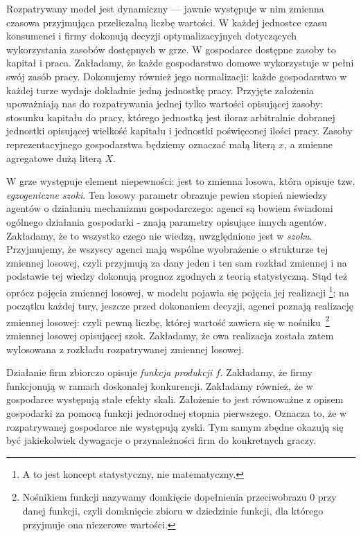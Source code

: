 Rozpatrywany model jest dynamiczny --- jawnie występuje w nim zmienna czasowa przyjmująca przeliczalną liczbę wartości. W każdej jednostce czasu konsumenci i firmy dokonują decyzji optymalizacyjnych dotyczących wykorzystania zasobów dostępnych w grze. W gospodarce dostępne zasoby to kapitał i praca. Zakładamy, że każde gospodarstwo domowe wykorzystuje w pełni swój zasób pracy. Dokonujemy również jego normalizacji: każde gospodarstwo w każdej turze wydaje dokładnie jedną jednostkę pracy. Przyjęte założenia upoważniają nas do rozpatrywania jednej tylko wartości opisującej zasoby: stosunku kapitału do pracy, którego jednostką jest iloraz arbitralnie dobranej jednostki opisującej wielkość kapitału i jednostki poświęconej ilości pracy. Zasoby reprezentacyjnego gospodarstwa będziemy oznaczać małą literą $ x $, a zmienne agregatowe dużą literą $ X $.

W grze występuje element niepewności: jest to zmienna losowa, która opisuje tzw. {\it egzogeniczne szoki}. Ten losowy parametr obrazuje pewien stopień niewiedzy agentów o działaniu mechanizmu gospodarczego: agenci są bowiem świadomi ogólnego działania gospodarki - znają parametry opisujące innych agentów. Zakładamy, że to wszystko czego nie wiedzą, uwzględnione jest w {\it szoku}. Przyjmujemy, że wszyscy agenci mają wspólne wyobrażenie o strukturze tej zmiennej losowej, czyli przyjmują za dany jeden i ten sam rozkład zmiennej i na podstawie tej wiedzy dokonują prognoz zgodnych z teorią statystyczną. Stąd też oprócz pojęcia zmiennej losowej, w modelu pojawia się pojęcia jej realizacji \footnote{A to jest koncept statystyczny, nie matematyczny.}:
na początku każdej tury, jeszcze przed dokonaniem decyzji, agenci poznają realizację zmiennej losowej: czyli pewną liczbę, której wartość zawiera się w nośniku~\footnote{Nośnikiem funkcji nazywamy domkięcie dopełnienia przeciwobrazu $0$ przy danej funkcji, czyli domknięcie zbioru w dziedzinie funkcji, dla którego przyjmuje ona niezerowe wartości.} zmiennej losowej opisującej szok. Zakładamy, że owa realizacja została zatem wylosowana z rozkładu rozpatrywanej zmiennej losowej.     

Działanie firm zbiorczo opisuje {\it funkcja produkcji} $f$. Zakładamy, że firmy funkcjonują w ramach doskonałej konkurencji. Zakładamy również, że w gospodarce występują stałe efekty skali. Założenie to jest równoważne z opisem gospodarki za pomocą funkcji jednorodnej stopnia pierwszego. Oznacza to, że w rozpatrywanej gospodarce nie występują zyski. Tym samym zbędne okazują się być jakiekolwiek dywagacje o przynależności firm do konkretnych graczy.  

